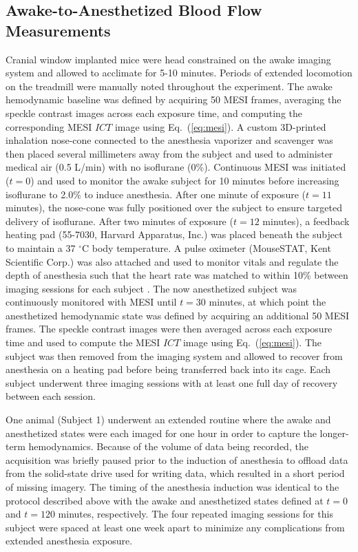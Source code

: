 \documentclass[review]{elsarticle}
\begin{document}

\subsection{Awake-to-Anesthetized Blood Flow Measurements}

Cranial window implanted mice were head constrained on the awake imaging system and allowed to acclimate for 5-10 minutes. Periods of extended locomotion on the treadmill were manually noted throughout the experiment. The awake hemodynamic baseline was defined by acquiring 50 MESI frames, averaging the speckle contrast images across each exposure time, and computing the corresponding MESI $ICT$ image using Eq.~(\ref{eq:mesi}). A custom 3D-printed inhalation nose-cone connected to the anesthesia vaporizer and scavenger was then placed several millimeters away from the subject and used to administer medical air (0.5 L/min) with no isoflurane (0\%). Continuous MESI was initiated ($t = 0$) and used to monitor the awake subject for 10 minutes before increasing isoflurane to 2.0\% to induce anesthesia. After one minute of exposure ($t = 11$ minutes), the nose-cone was fully positioned over the subject to ensure targeted delivery of isoflurane. After two minutes of exposure ($t = 12$ minutes), a feedback heating pad (55-7030, Harvard Apparatus, Inc.) was placed beneath the subject to maintain a 37 $^\circ$C body temperature. A pulse oximeter (MouseSTAT, Kent Scientific Corp.) was also attached and used to monitor vitals and regulate the depth of anesthesia such that the heart rate was matched to within 10\% between imaging sessions for each subject \cite{Kazmi:2013hp}. The now anesthetized subject was continuously monitored with MESI until $t = 30$ minutes, at which point the anesthetized hemodynamic state was defined by acquiring an additional 50 MESI frames. The speckle contrast images were then averaged across each exposure time and used to compute the MESI $ICT$ image using Eq.~(\ref{eq:mesi}). The subject was then removed from the imaging system and allowed to recover from anesthesia on a heating pad before being transferred back into its cage. Each subject underwent three imaging sessions with at least one full day of recovery between each session.

One animal (Subject 1) underwent an extended routine where the awake and anesthetized states were each imaged for one hour in order to capture the longer-term hemodynamics. Because of the volume of data being recorded, the acquisition was briefly paused prior to the induction of anesthesia to offload data from the solid-state drive used for writing data, which resulted in a short period of missing imagery. The timing of the anesthesia induction was identical to the protocol described above with the awake and anesthetized states defined at $t = 0$ and $t = 120$ minutes, respectively. The four repeated imaging sessions for this subject were spaced at least one week apart to minimize any complications from extended anesthesia exposure.
\end{document}
